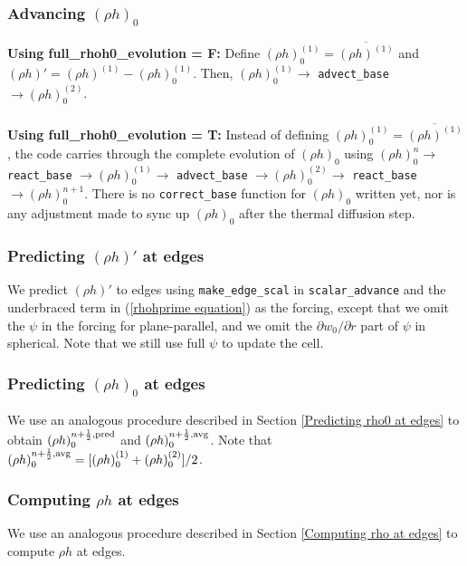 \documentclass[11pt]{article}
\def\half  {\frac{1}{2}}
\begin{document}
\subsubsection{Advancing $(\rho h)_0$}
{\bf Using full\_rhoh0\_evolution = F:}  Define 
$(\rho h)_0^{(1)} = \overline{(\rho h)^{(1)}}$  
and $(\rho h)' = (\rho h)^{(1)}-(\rho h)_0^{(1)}$.  Then, $(\rho h)_0^{(1)} \rightarrow$ 
{\tt advect\_base} $\rightarrow (\rho h)_0^{(2)}$.\\ \\
{\bf Using full\_rhoh0\_evolution = T:}
 Instead of defining $(\rho h)_0^{(1)} = \overline{(\rho h)^{(1)}}$, the code carries 
through the complete evolution of $(\rho h)_0$ using $(\rho h)_0^n \rightarrow$ {\tt react\_base}
$\rightarrow (\rho h)_0^{(1)} \rightarrow$ {\tt advect\_base}
$\rightarrow (\rho h)_0^{(2)} \rightarrow$ {\tt react\_base} $\rightarrow (\rho h)_0^{n+1}$.  
There is no {\tt correct\_base} function for $(\rho h)_0$ written yet, nor is any 
adjustment made to sync up $(\rho h)_0$ after the thermal diffusion step.
\subsubsection{Predicting $(\rho h)'$ at edges}\label{Predicting rhohprime at edges}
We predict $(\rho h)'$ to 
edges using {\tt make\_edge\_scal} in {\tt scalar\_advance} and the underbraced term in 
(\ref{rhohprime equation}) as the forcing, except that we omit the $\psi$ in the forcing for plane-parallel, and we omit the $\partial w_0/\partial r$ part of $\psi$ in spherical.  Note that we still use full $\psi$ to update the cell.
\subsubsection{Predicting $(\rho h)_0$ at edges}
We use an analogous procedure described in Section \ref{Predicting rho0 at edges} to 
obtain $(\rho h)_0^{n+\half,\rm{pred}}$ and $(\rho h)_0^{n+\half,\rm{avg}}$.  Note that 
$(\rho h)_0^{n+\half,{\rm avg}} = [(\rho h)_0^{(1)} + (\rho h)_0^{(2)}]/2$.
\subsubsection{Computing $\rho h$ at edges}
We use an analogous procedure described in Section \ref{Computing rho at edges} to compute
$\rho h$ at edges.
\end{document}

